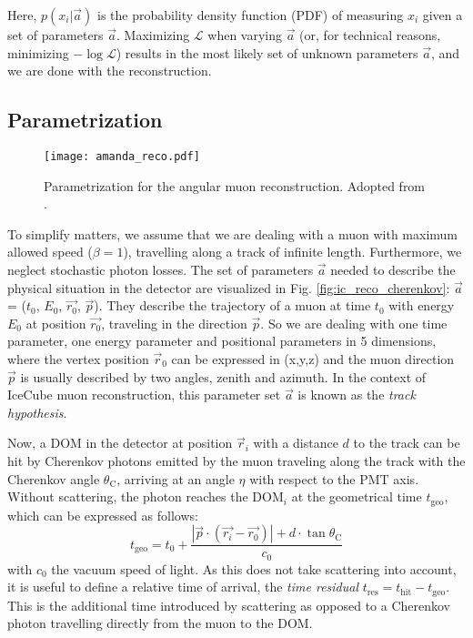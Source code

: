 Here, $p(x_i|\vec{a})$ is the probability density function (PDF) of measuring $x_i$ given a set of parameters $\vec{a}$. Maximizing $\mathcal{L}$ when varying $\vec{a}$ (or, for technical reasons, minimizing $-\log{\mathcal{L}}$) results in the most likely set of unknown parameters $\vec{a}$, and we are done with the reconstruction.

\subsection{Parametrization}
\begin{figure}[h!]
    \texttt{[image: amanda\_reco.pdf]}
    \caption[Angular reconstruction in IceCube]{Parametrization for the angular muon reconstruction. Adopted from \cite{Ahrens2004}.}
\end{figure}

To simplify matters, we assume that we are dealing with a muon with maximum allowed speed ($\beta=1$), travelling along a track of infinite length. Furthermore, we neglect stochastic photon losses. The set of parameters $\vec{a}$ needed to describe the physical situation in the detector are visualized in Fig. \ref{fig:ic_reco_cherenkov}: $\vec{a}$ = ($t_0$, $E_0$, $\vec{r_0}$, $\vec{p}$). They describe the trajectory of a muon at time $t_0$ with energy $E_0$ at position $\vec{r_0}$, traveling in the direction $\vec{p}$. So we are dealing with one time parameter, one energy parameter and positional parameters in 5 dimensions, where the vertex position $\vec{r}_0$ can be expressed in (x,y,z) and the muon direction $\vec{p}$ is usually described by two angles, zenith and azimuth. In the context of IceCube muon reconstruction, this parameter set $\vec{a}$ is known as the \textit{track hypothesis}.

Now, a DOM in the detector at position $\vec{r}_i$ with a distance $d$ to the track can be hit by Cherenkov photons emitted by the muon traveling along the track with the Cherenkov angle $\theta_\text{C}$, arriving at an angle $\eta$ with respect to the PMT axis. Without scattering, the photon reaches the $\text{DOM}_i$ at the geometrical time $t_\text{geo}$, which can be expressed as follows:
\begin{equation}
t_\text{geo} = t_0 + \frac{|\vec{p}\cdot(\vec{r_i}-\vec{r_0})|+d\cdot \tan{\theta_\text{C}}}{c_0}
\end{equation}
with $c_0$ the vacuum speed of light. As this does not take scattering into account, it is useful to define a relative time of arrival, the \textit{time residual} $t_\text{res} = t_\text{hit} - t_\text{geo}$. This is the additional time introduced by scattering as opposed to a Cherenkov photon travelling directly from the muon to the DOM.

